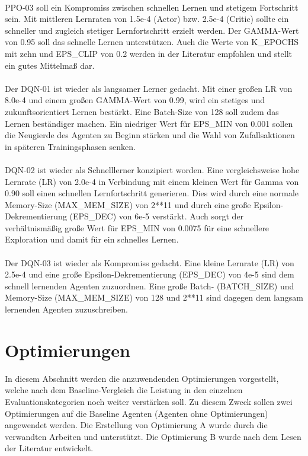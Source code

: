 \\PPO-03 soll ein Kompromiss zwischen schnellen Lernen und stetigem Fortschritt sein. Mit mittleren Lernraten von 1.5e-4 (Actor) bzw. 2.5e-4 (Critic) sollte ein schneller und zugleich stetiger Lernfortschritt erzielt werden. Der GAMMA-Wert von 0.95 soll das schnelle Lernen unterstützen. Auch die Werte von K\_EPOCHS mit zehn und EPS\_CLIP von 0.2 werden in der Literatur \cite[Anhang A]{PPO} empfohlen und stellt ein gutes Mittelmaß dar.\\
\\Der DQN-01 ist wieder als langsamer Lerner gedacht. Mit einer großen LR von 8.0e-4 und einem großen GAMMA-Wert von 0.99, wird ein stetiges und zukunftsorientiert Lernen bestärkt. Eine Batch-Size von 128 soll zudem das Lernen beständiger machen. Ein niedriger Wert für EPS\_MIN von 0.001 sollen die Neugierde des Agenten zu Beginn stärken und die Wahl von Zufallsaktionen in späteren Trainingsphasen senken.\\
\\DQN-02 ist wieder als Schnelllerner konzipiert worden. Eine vergleichsweise hohe Lernrate (LR) von 2.0e-4 in Verbindung mit einem kleinen Wert für Gamma von 0.90 soll einen schnellen Lernfortschritt generieren. Dies wird durch eine normale Memory-Size (MAX\_MEM\_SIZE) von 2**11 und durch eine große Epsilon-Dekrementierung (EPS\_DEC) von 6e-5 verstärkt. Auch sorgt der verhältnismäßig große Wert für EPS\_MIN von 0.0075 für eine schnellere Exploration und damit für ein schnelles Lernen.\\
\\Der DQN-03 ist wieder als Kompromiss gedacht. Eine kleine Lernrate (LR) von 2.5e-4 und eine große Epsilon-Dekrementierung (EPS\_DEC) von 4e-5 sind dem schnell lernenden Agenten zuzuordnen. Eine große Batch- (BATCH\_SIZE) und Memory-Size (MAX\_MEM\_SIZE) von 128 und 2**11 sind dagegen dem langsam lernenden Agenten zuzuschreiben.

\section{Optimierungen} \label{sec:Konzept_Optimierungen}
In diesem Abschnitt werden die anzuwendenden Optimierungen vorgestellt, welche nach dem Baseline-Vergleich die Leistung in den einzelnen Evaluationskategorien noch weiter verstärken soll. Zu diesem Zweck sollen zwei Optimierungen auf die Baseline Agenten (Agenten ohne Optimierungen) angewendet werden. Die Erstellung von Optimierung A wurde durch die verwandten Arbeiten \cite{UAV} und \cite{Autonomous_Agents_in_Snake_Game_via_DRL} unterstützt. Die Optimierung B wurde nach dem Lesen der Literatur \cite[S. 331 f.]{DRL_Lapan} entwickelt.\\

